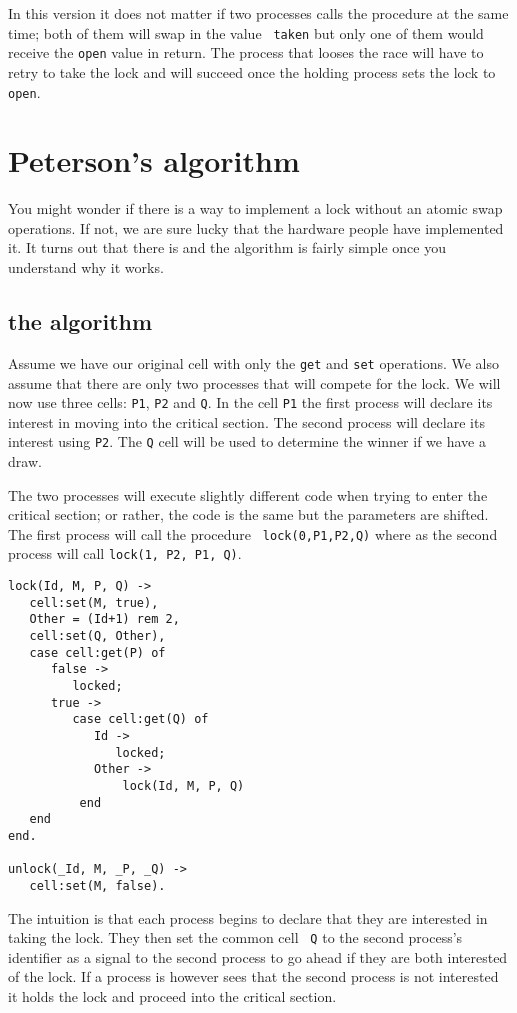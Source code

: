 \documentclass[a4paper,11pt]{article}
\begin{document}
In this version it does not matter if two processes calls the
procedure at the same time; both of them will swap in the value {\tt
  taken} but only one of them would receive the {\tt open} value in
return. The process that looses the race will have to retry to take
the lock and will succeed once the holding process sets the lock to
{\tt open}.

\section{Peterson's algorithm}

You might wonder if there is a way to implement a lock without an
atomic swap operations. If not, we are sure lucky that the hardware
people have implemented it. It turns out that there is and the
algorithm is fairly simple once you understand why it works.

\subsection{the algorithm}

Assume we have our original cell with only the {\tt get} and {\tt set}
operations. We also assume that there are only two processes that will
compete for the lock. We will now use three cells: {\tt P1}, {\tt P2}
and {\tt Q}. In the cell {\tt P1} the first process will declare its
interest in moving into the critical section. The second process will
declare its interest using {\tt P2}. The {\tt Q} cell will be used to
determine the winner if we have a draw.


The two processes will execute slightly different code when trying to
enter the critical section; or rather, the code is the same but the
parameters are shifted. The first process will call the procedure {\tt
  lock(0,P1,P2,Q)} where as the second process will call {\tt lock(1, P2, P1,
  Q)}.

\begin{verbatim}
lock(Id, M, P, Q) ->
   cell:set(M, true),
   Other = (Id+1) rem 2,
   cell:set(Q, Other), 
   case cell:get(P) of
      false ->
         locked;
      true ->
         case cell:get(Q) of
            Id -> 
               locked;
            Other ->
                lock(Id, M, P, Q)
          end
   end
end.

unlock(_Id, M, _P, _Q) ->
   cell:set(M, false).
\end{verbatim}

The intuition is that each process begins to declare that they are
interested in taking the lock. They then set the common cell {\tt
  Q} to the second process's identifier as a signal to the second
process to go ahead if they are both interested of the lock. If a
process is however sees that the second process is not interested it
holds the lock and proceed into the critical section.
\end{document}
